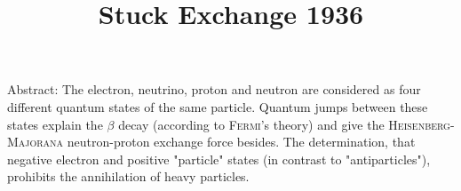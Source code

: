 \documentclass{article}
\title{Stuck Exchange 1936}
\begin{document}
Abstract: The electron, neutrino, proton and neutron are considered as four different quantum states of the same particle. Quantum jumps between these states explain the $\beta$ decay (according to \textsc{Fermi}'s theory) and give the \textsc{Heisenberg-Majorana} neutron-proton exchange force besides. The determination, that negative electron and positive "particle" states (in contrast to "antiparticles"), prohibits the annihilation of heavy particles.
\end{document}
